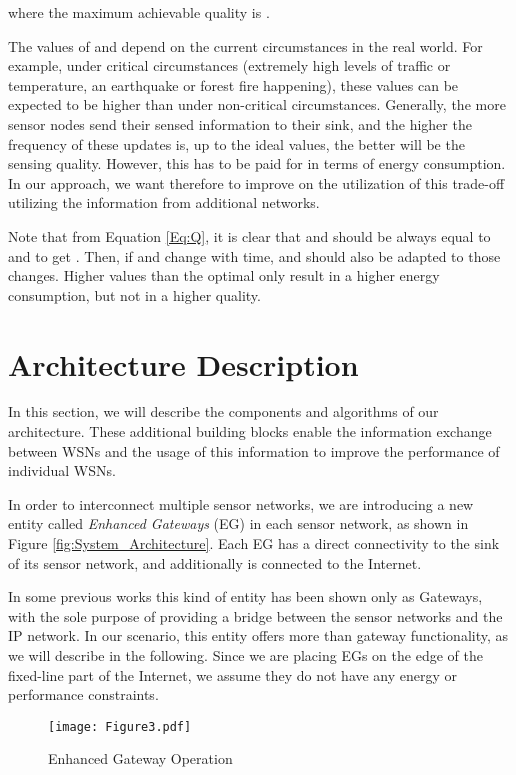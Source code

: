\documentclass[onecolumn]{jaise2e}
\begin{document}
where the maximum achievable quality is . 

The values of  and  depend on the current circumstances in the real world. For example, under critical circumstances (extremely high levels of traffic or temperature, an earthquake or forest fire happening), these values can be expected to be higher than under non-critical circumstances. Generally, the more sensor nodes send their sensed information to their sink, and the higher the frequency of these updates is, up to the ideal values, the better will be the sensing quality. However, this has to be paid for in terms of energy consumption. In our approach, we want therefore to improve on the utilization of this trade-off utilizing the information from additional networks.

Note that from Equation \ref{Eq:Q}, it is clear that  and  should be always equal to  and  to get . Then, if  and  change with time,  and  should also be adapted to those changes. Higher values than the optimal only result in a higher energy consumption, but not in a higher quality.
 





\section{Architecture Description}\label{sec:arch}

In this section, we will describe the components and algorithms of our architecture. These additional building blocks enable the information exchange between WSNs and the usage of this information to improve the performance of individual WSNs.

In order to interconnect multiple sensor networks, we are introducing a new entity called \textit{Enhanced Gateways} (EG) in each sensor network, as shown in Figure \ref{fig:System_Architecture}. Each EG has a direct connectivity to the sink of its sensor network, and additionally is connected to the Internet.

In some previous works this kind of entity has been shown only as Gateways, with the sole purpose of providing a bridge between the sensor networks and the IP network. In our scenario, this entity offers more than gateway functionality, as we will describe in the following. Since we are placing EGs on the edge of the fixed-line part of the Internet, we assume they do not have any energy or performance constraints.

\begin{figure*}[t]
\centering
\texttt{[image: Figure3.pdf]} 
\caption{Enhanced Gateway Operation}
\label{fig:Flow Chart}
\end{figure*}
\end{document}

